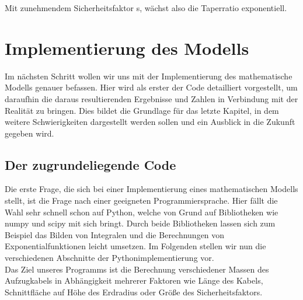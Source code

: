 \documentclass[a4paper, 10pt]{report}
\begin{document}
Mit zunehmendem Sicherheitsfaktor s, wächst also die Taperratio exponentiell.

\chapter{Implementierung des Modells}
Im nächsten Schritt wollen wir uns mit der Implementierung des mathematische Modells genauer befassen. Hier wird als erster der Code detailliert vorgestellt, um daraufhin die daraus resultierenden Ergebnisse und Zahlen in Verbindung mit der Realität zu bringen. Dies bildet die Grundlage für das letzte Kapitel, in dem weitere Schwierigkeiten dargestellt werden sollen und ein Ausblick in die Zukunft gegeben wird.
\section{Der zugrundeliegende Code}
Die erste Frage, die sich bei einer Implementierung eines mathematischen Modells stellt, ist die Frage nach einer geeigneten Programmiersprache. Hier fällt die Wahl sehr schnell schon auf Python, welche von Grund auf Bibliotheken wie numpy und scipy mit sich bringt. Durch beide Bibliotheken lassen sich zum Beispiel das Bilden von Integralen und die Berechnungen von Exponentialfunktionen leicht umsetzen. 
Im Folgenden stellen wir nun die verschiedenen Abschnitte der Pythonimplementierung vor.\\
Das Ziel unseres Programms ist die Berechnung verschiedener Massen des Aufzugkabels in Abhängigkeit mehrerer Faktoren wie Länge des Kabels, Schnittfläche auf Höhe des Erdradius oder Größe des Sicherheitsfaktors.
 
\end{document}
